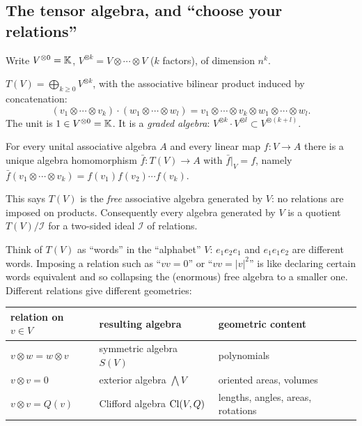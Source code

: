 \subsection{The tensor algebra, and ``choose your relations''}\label{sec:tensoralgebra}
Write $V^{\otimes 0}=\mathbb{K}$, $V^{\otimes k}=V\otimes\cdots\otimes V$ ($k$ factors), of dimension $n^k$.

\begin{definition}
$T(V)=\bigoplus_{k\ge0}V^{\otimes k}$, with the associative bilinear product induced by concatenation:
\[
 (v_1\otimes\cdots\otimes v_k)\cdot(w_1\otimes\cdots\otimes w_l)=v_1\otimes\cdots\otimes v_k\otimes w_1\otimes\cdots\otimes w_l .
\]
The unit is $1\in V^{\otimes0}=\mathbb{K}$. It is a \emph{graded algebra}: $V^{\otimes k}\cdot V^{\otimes l}\subset V^{\otimes(k+l)}$.
\end{definition}

\begin{theorem}\label{thm:Tuniv}
For every unital associative algebra $A$ and every linear map $f:V\to A$ there is a unique algebra homomorphism
$\bar f:T(V)\to A$ with $\bar f|_V=f$, namely $\bar f(v_1\otimes\cdots\otimes v_k)=f(v_1)f(v_2)\cdots f(v_k)$.
\end{theorem}

This says $T(V)$ is the \emph{free} associative algebra generated by $V$: no relations are imposed on products.
Consequently every algebra generated by $V$ is a quotient $T(V)/\mathcal I$ for a two-sided ideal $\mathcal I$ of relations.

\begin{intuition}
Think of $T(V)$ as ``words'' in the ``alphabet'' $V$: $e_1e_2e_1$ and $e_1e_1e_2$ are different words.
Imposing a relation such as ``$vv=0$'' or ``$vv=|v|^2$'' is like declaring certain words equivalent and so
collapsing the (enormous) free algebra to a smaller one. Different relations give different geometries:
\begin{center}
\begin{tabular}{lll}
relation on $v\in V$ & resulting algebra & geometric content\\\hline
$v\otimes w=w\otimes v$ & symmetric algebra $S(V)$ & polynomials\\
$v\otimes v=0$ & exterior algebra $\bigwedge V$ & oriented areas, volumes\\
$v\otimes v=Q(v)$ & Clifford algebra $\mathrm{Cl}(V,Q)$ & lengths, angles, areas, rotations
\end{tabular}
\end{center}
\end{intuition}
